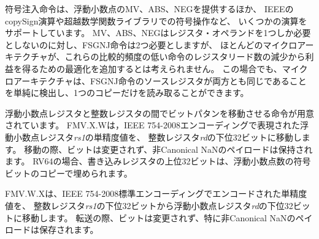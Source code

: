 {\begin{commentary}
符号注入命令は、浮動小数点のMV、ABS、NEGを提供するほか、
IEEEのcopySign演算や超越数学関数ライブラリでの符号操作など、
いくつかの演算をサポートしています。 
MV、ABS、NEGはレジスタ・オペランドを1つしか必要としないのに対し、FSGNJ命令は2つ必要としますが、
ほとんどのマイクロアーキテクチャが、これらの比較的頻度の低い命令のレジスタリード数の減少から利益を得るための最適化を追加するとは考えられません。
この場合でも、マイクロアーキテクチャは、FSGNJ命令のソースレジスタが両方とも同じであることを単純に検出し、1つのコピーだけを読み取ることができます。

\end{commentary}

\begin{comment}
Instructions are provided to move bit patterns between the
floating-point and integer registers.  FMV.X.W moves the
single-precision value in floating-point register {\em rs1}
represented in IEEE 754-2008 encoding to the lower 32 bits of integer
register {\em rd}.  The bits are not
modified in the transfer, and in particular, the payloads of
non-canonical NaNs are preserved.
For RV64, the higher 32 bits of the destination
register are filled with copies of the floating-point number's sign
bit.
\end{comment}

浮動小数点レジスタと整数レジスタの間でビットパタンを移動させる命令が用意されています。
FMV.X.Wは，IEEE 754-2008エンコーディングで表現された浮動小数点レジスタ{\em rs1}の単精度値を、
整数レジスタ{\em rd}の下位32ビットに移動します。 
移動の際、ビットは変更されず、非Canonical NaNのペイロードは保持されます。
RV64の場合、書き込みレジスタの上位32ビットは、浮動小数点数の符号ビットのコピーで埋められます。

\begin{comment}
FMV.W.X moves the single-precision value encoded in IEEE
754-2008 standard encoding from the lower 32 bits of integer register
{\em rs1} to the floating-point register {\em rd}.  The bits are not
modified in the transfer, and in particular, the payloads of
non-canonical NaNs are preserved.
\end{comment}

FMV.W.Xは、IEEE 754-2008標準エンコーディングでエンコードされた単精度値を、
整数レジスタ{\em rs1}の下位32ビットから浮動小数点レジスタ{\em rd}の下位32ビットに移動します。
転送の際、ビットは変更されず、特に非Canonical NaNのペイロードは保存されます。

\begin{commentary}
\begin{comment}
The FMV.W.X and FMV.X.W instructions were previously called FMV.S.X
and FMV.X.S.  The use of W is more consistent with their semantics as
an instruction that moves 32 bits without interpreting them.  This
became clearer after defining NaN-boxing.  To avoid disturbing
existing code, both the W and S versions will be supported by tools.
\end{comment}


\end{commentary}}
